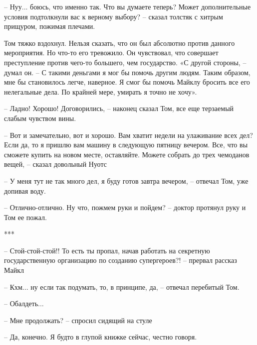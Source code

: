 – Нуу... боюсь, что именно так. Что вы думаете теперь? Может дополнительные условия подтолкнули вас к верному выбору? – сказал толстяк с хитрым прищуром, пожимая плечами. 

Том тяжко вздохнул. Нельзя сказать, что он был абсолютно против данного мероприятия. Но что-то его тревожило. Он чувствовал, что совершает преступление против чего-то большего, чем государство. «С другой стороны, – думал он. – С такими деньгами я мог бы помочь другим людям. Таким образом, мне бы становилось легче, наверное. Я смог бы помочь Майклу бросить все его нелегальные дела. По крайней мере, умирать я точно не хочу».

– Ладно! Хорошо! Договорились, – наконец сказал Том, все еще терзаемый слабым чувством вины. 

– Вот и замечательно, вот и хорошо. Вам хватит недели на улаживание всех дел? Если да, то я пришлю вам машину в следующую пятницу вечером. Все, что вы сможете купить на новом месте, оставляйте. Можете собрать до трех чемоданов вещей, – сказал довольный Нуотс

– У меня тут не так много дел, я буду готов завтра вечером, – отвечал Том, уже допивая воду. 

– Отлично-отлично. Ну что, пожмем руки и пойдем? – доктор протянул руку и Том ее пожал. 

\begin{center}***\end{center}

– Стой-стой-стой!! То есть ты пропал, начав работать на секретную государственную организацию по созданию супергероев?! – прервал рассказ Майкл

– Кхм... ну если так подумать, то, в принципе, да, – отвечал перебитый Том.

– Обалдеть...

– Мне продолжать? – спросил сидящий на стуле

– Да, конечно. Я будто в глупой книжке сейчас, честно говоря. 
\clearpage
{\begingroup
{}
\noindent
\endgroup}
\cleardoublepage

